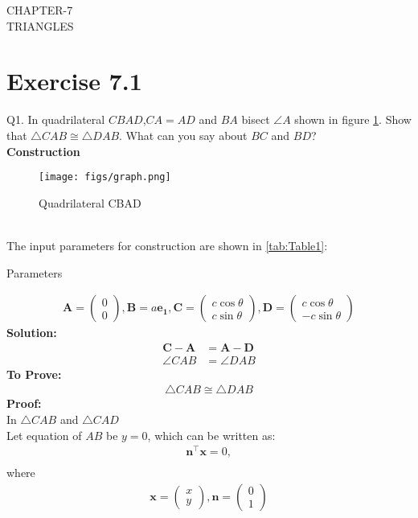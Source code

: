 \documentclass{article}
\newcommand{\solution}{\noindent \textbf{Solution: }}
\newcommand{\myvec}[1]{\ensuremath{\begin{pmatrix}#1\end{pmatrix}}}
\let\vec\mathbf
\begin{document}
\begin{center}
        \textbf\large{CHAPTER-7 \\ TRIANGLES}
\end{center}
\section{Exercise 7.1}
Q1. In quadrilateral $CBAD$,$CA = AD$ and $BA$ bisect $\angle{A}$ shown in figure \ref{fig:Fig1}. Show that $\triangle{CAB} \cong \triangle{DAB}$. What can you say about $BC$ and $BD$? \\
\textbf{Construction}\\
\begin{figure}[H]
	\begin{center}
		\texttt{[image: figs/graph.png]}
	\end{center}
	\caption{Quadrilateral CBAD}
	\label{fig:Fig1}
\end{figure}
\pagebreak
\\ The input parameters for construction are shown in \ref{tab:Table1}:\\
\begin{table}[H]
	  \centering
	  
	  \caption{Parameters}
	  \label{tab:Table1}
\end{table}
\begin{align}
	\vec{A} = \myvec{0\\0},\vec{B} = a\vec{e_1},\vec{C} = \myvec{c\cos\theta\\c\sin\theta},\vec{D} = \myvec{c\cos\theta\\-c\sin\theta}
\end{align}
\solution
\begin{align}
	\vec{C}-\vec{A} &= \vec{A}-\vec{D}\\
	\angle{CAB} &= \angle{DAB}
\end{align}
\textbf{To Prove:}
	\begin{align}
		\triangle{CAB} \cong \triangle{DAB}
	\end{align}
\textbf{Proof:}\\
In $\triangle{CAB}$ and $\triangle{CAD}$\\
Let  equation of $AB$ be $y = 0$, which can be written as:
\begin{align}
	\vec{n}^{\top}\vec{x} = 0,\\
\end{align}
where
\begin{align}
\vec{x} = \myvec{x\\y},\vec{n} = \myvec{0\\1}
\end{align}
\end{document}
